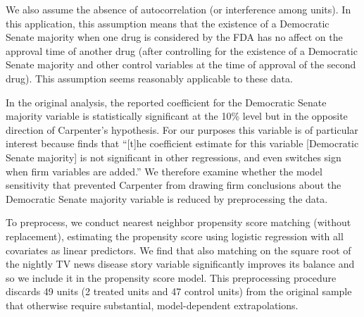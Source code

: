 \documentclass[11pt,titlepage]{article}
\begin{document}
We also assume the absence of autocorrelation (or interference among
units).  In this application, this assumption means that the existence
of a Democratic Senate majority when one drug is considered by the FDA
has no affect on the approval time of another drug (after
controlling for the existence of a Democratic Senate majority and
other control variables at the time of approval of the second drug).
This assumption seems reasonably applicable to these data.

In the original analysis, the reported coefficient for the Democratic
Senate majority variable is statistically significant at the 10\%
level but in the opposite direction of Carpenter's hypothesis.  For
our purposes this variable is of particular interest because
\citet[p.498]{Carpenter02} finds that ``[t]he coefficient estimate for this
variable [Democratic Senate majority] is not significant in other
regressions, and even switches sign when firm variables are added.''
We therefore examine whether the model sensitivity that prevented
Carpenter from drawing firm conclusions about the Democratic Senate
majority variable is reduced by preprocessing the data.

To preprocess, we conduct nearest neighbor propensity score matching
(without replacement), estimating the propensity score using logistic
regression with all covariates as linear predictors. We find that also
matching on the square root of the nightly TV news disease story
variable significantly improves its balance and so we include it in the propensity score model.
This preprocessing procedure discards 49 units (2 treated units and 47
control units) from the original sample that otherwise require
substantial, model-dependent extrapolations.
\end{document}
